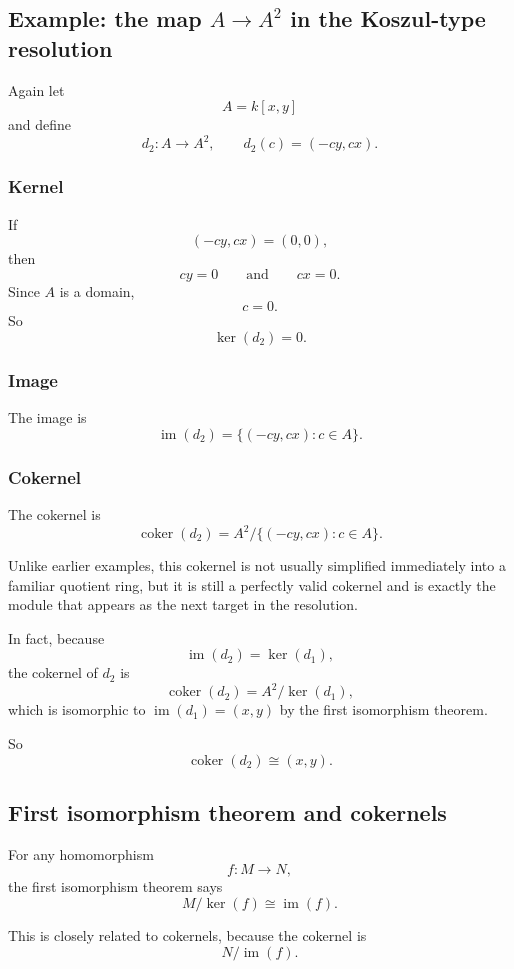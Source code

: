 \documentclass[12pt,a4paper]{article}
\theoremstyle{notespace}
\theoremstyle{definition}
\begin{document}
\subsection{ Example: the map \(A\to A^2\) in the Koszul-type resolution}

Again let
\[
A=k[x,y]
\]
and define
\[
d_2:A\longrightarrow A^2,
\qquad
d_2(c)=(-cy,cx).
\]

\subsubsection*{Kernel}

If
\[
(-cy,cx)=(0,0),
\]
then
\[
cy=0
\qquad\text{and}\qquad
cx=0.
\]
Since \(A\) is a domain,
\[
c=0.
\]
So
\[
\ker(d_2)=0.
\]

\subsubsection*{Image}

The image is
\[
\operatorname{im}(d_2)=\{(-cy,cx):c\in A\}.
\]

\subsubsection*{Cokernel}

The cokernel is
\[
\operatorname{coker}(d_2)=A^2/\{(-cy,cx):c\in A\}.
\]

Unlike earlier examples, this cokernel is not usually simplified immediately into a familiar quotient ring, but it is still a perfectly valid cokernel and is exactly the module that appears as the next target in the resolution.

In fact, because
\[
\operatorname{im}(d_2)=\ker(d_1),
\]
the cokernel of \(d_2\) is
\[
\operatorname{coker}(d_2)=A^2/\ker(d_1),
\]
which is isomorphic to \(\operatorname{im}(d_1)=(x,y)\) by the first isomorphism theorem.

So
\[
\operatorname{coker}(d_2)\cong (x,y).
\]

\subsection{ First isomorphism theorem and cokernels}

For any homomorphism
\[
f:M\to N,
\]
the first isomorphism theorem says
\[
M/\ker(f)\cong \operatorname{im}(f).
\]

This is closely related to cokernels, because the cokernel is
\[
N/\operatorname{im}(f).
\]
\end{document}

